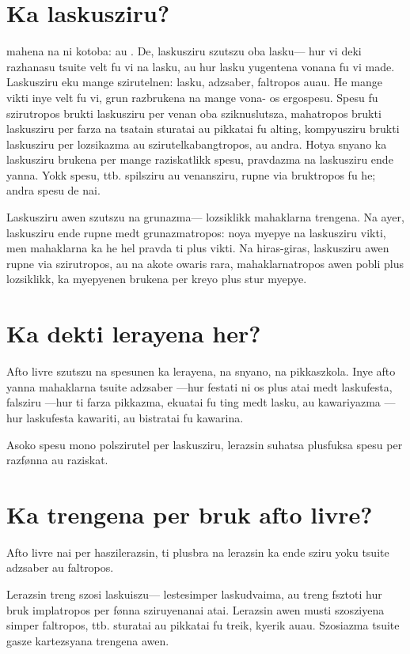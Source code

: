 \section{Ka laskusziru?}
 mahena na ni kotoba:  au . De, laskusziru
szutszu oba lasku--- hur vi deki razhanasu tsuite velt fu vi na lasku,
au hur lasku yugentena vonana fu vi made. Laskusziru eku mange szirutelnen:
lasku, adzsaber, faltropos auau. He mange vikti inye velt fu vi, grun
razbrukena na mange vona- os ergospesu. Spesu fu szirutropos brukti laskusziru
per venan oba sziknuslutsza, mahatropos brukti laskusziru per farza na tsatain
sturatai au pikkatai fu alting, kompyusziru brukti laskusziru per lozsikazma au
szirutelkabangtropos, au andra. Hotya snyano ka laskusziru brukena per mange
raziskatlikk spesu, pravdazma na laskusziru ende yanna. Yokk spesu, ttb.
spilsziru au venansziru, rupne via bruktropos fu he; andra spesu de nai.

Laskusziru awen szutszu na grunazma--- lozsiklikk mahaklarna trengena. Na ayer,
laskusziru ende rupne medt grunazmatropos: noya myepye na laskusziru vikti,
men mahaklarna ka he hel pravda ti plus vikti. Na hiras-giras, laskusziru
awen rupne via szirutropos, au na akote owaris rara, mahaklarnatropos awen
pobli plus lozsiklikk, ka myepyenen brukena per kreyo plus stur myepye.

\section{Ka dekti lerayena her?}
Afto livre szutszu na spesunen ka lerayena, na snyano, na pikkaszkola. Inye
afto yanna mahaklarna tsuite adzsaber ---hur festati ni os plus atai medt
laskufesta, falsziru ---hur ti farza pikkazma, ekuatai fu ting medt lasku,
au kawariyazma ---hur laskufesta kawariti, au bistratai fu kawarina.

Asoko spesu mono polszirutel per laskusziru, lerazsin suhatsa plusfuksa
spesu per razfønna au raziskat.

\section{Ka trengena per bruk afto livre?}
Afto livre nai per haszilerazsin, ti plusbra na lerazsin ka ende sziru yoku
tsuite adzsaber au faltropos.

Lerazsin treng szosi laskuiszu--- lestesimper laskudvaima, au treng fsztoti hur
bruk implatropos per fønna sziruyenanai atai. Lerazsin
awen musti szosziyena simper faltropos, ttb. sturatai au pikkatai
fu treik, kyerik auau. Szosiazma tsuite gasze kartezsyana trengena awen.

